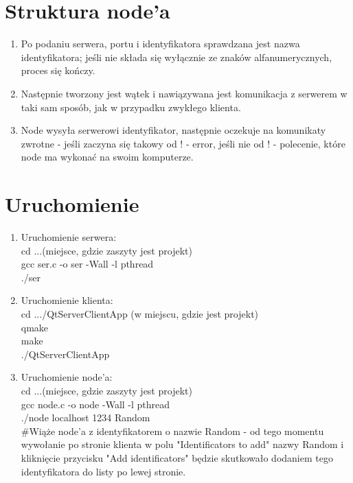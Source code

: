 \documentclass[12pt]{article}
\begin{document}
\section{Struktura node'a}
\begin{enumerate}
	\item Po podaniu serwera, portu i identyfikatora sprawdzana jest nazwa identyfikatora; jeśli nie składa się wyłącznie ze znaków alfanumerycznych, proces się kończy.
	\item Następnie tworzony jest wątek i nawiązywana jest komunikacja z serwerem w taki sam sposób, jak w przypadku zwykłego klienta.
	\item Node wysyła serwerowi identyfikator, następnie oczekuje na komunikaty zwrotne - jeśli zaczyna się takowy od ! - error, jeśli nie od ! - polecenie, które node ma wykonać na swoim komputerze.
\end{enumerate}

\section{Uruchomienie}
\begin{enumerate}
	\item Uruchomienie serwera:\\
		cd ...(miejsce, gdzie zaszyty jest projekt)\\
		gcc ser.c -o ser -Wall -l pthread\\
		./ser
	\item Uruchomienie klienta:\\
		cd .../QtServerClientApp (w miejscu, gdzie jest projekt)\\
		qmake\\
		make\\
		./QtServerClientApp
	\item Uruchomienie node'a:\\
	cd ...(miejsce, gdzie zaszyty jest projekt)\\
	gcc node.c -o node -Wall -l pthread\\
	./node localhost 1234 Random\\
	\#Wiąże node'a z identyfikatorem o nazwie Random - od tego momentu wywołanie po stronie klienta w polu "Identificators to add" nazwy Random i kliknięcie przycisku "Add identificators" będzie skutkowało dodaniem tego identyfikatora do listy po lewej stronie.
		
\end{enumerate}
\end{document}
